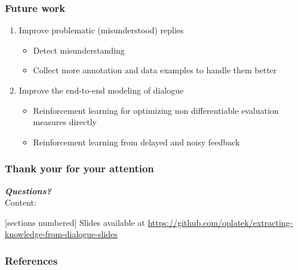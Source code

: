 \documentclass[10pt, compress,british,xcolor={svgnames,dvipsnames,x11names},trans]{beamer}
\begin{document}
\begin{frame}\frametitle{Future work}
    \begin{enumerate}
        \item Improve problematic (misunderstood) replies
            \begin{itemize}
                \item Detect misunderstanding
                \item Collect more annotation and data examples to handle them better
            \end{itemize}
        \item Improve the end-to-end modeling of dialogue
            \begin{itemize}
                \item Reinforcement learning for optimizing non differentiable evaluation measures directly
                \item Reinforcement learning from delayed and noisy feedback
            \end{itemize}
    \end{enumerate}
\end{frame}




\begin{frame}\frametitle{Thank your for your attention}
    {\bf \large \it Questions?} \\
    \vfill
    Content:

  [sections numbered]
  \tableofcontents
    \vfill
    {\footnotesize Slides available at \url{https://github.com/oplatek/extracting-knowledge-from-dialogue-slides}}

\end{frame}

\appendix

\begin{frame}[allowframebreaks]
        \frametitle{References}
        
        
\end{frame}
\end{document}
